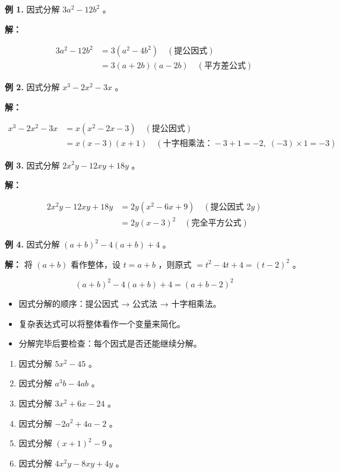\begin{workedexamples}


\textbf{例 1.} 因式分解 $3a^2 - 12b^2$ 。

\textbf{解：}

\[
\begin{aligned}
3a^2 - 12b^2 &= 3(a^2 - 4b^2) \quad (\text{提公因式}) \\
&= 3(a + 2b)(a - 2b) \quad (\text{平方差公式})
\end{aligned}
\]


\textbf{例 2.} 因式分解 $x^3 - 2x^2 - 3x$ 。

\textbf{解：}

\[
\begin{aligned}
x^3 - 2x^2 - 3x &= x(x^2 - 2x - 3) \quad (\text{提公因式}) \\
&= x(x - 3)(x + 1) \quad (\text{十字相乘法：} -3 + 1 = -2,\; (-3) \times 1 = -3)
\end{aligned}
\]


\textbf{例 3.} 因式分解 $2x^2y - 12xy + 18y$ 。

\textbf{解：}

\[
\begin{aligned}
2x^2y - 12xy + 18y &= 2y(x^2 - 6x + 9) \quad (\text{提公因式 } 2y) \\
&= 2y(x - 3)^2 \quad (\text{完全平方公式})
\end{aligned}
\]


\textbf{例 4.} 因式分解 $(a + b)^2 - 4(a + b) + 4$ 。

\textbf{解：} 将 $(a + b)$ 看作整体，设 $t = a + b$ ，则原式 $= t^2 - 4t + 4 = (t - 2)^2$ 。

\[
(a + b)^2 - 4(a + b) + 4 = (a + b - 2)^2
\]


\end{workedexamples}

\begin{keytakeaway}


\begin{itemize}
  \item 因式分解的顺序：提公因式 → 公式法 → 十字相乘法。
  \item 复杂表达式可以将整体看作一个变量来简化。
  \item 分解完毕后要检查：每个因式是否还能继续分解。
\end{itemize}


\end{keytakeaway}

\begin{practice}


\begin{enumerate}
  \item 因式分解 $5x^2 - 45$ 。
  \item 因式分解 $a^3b - 4ab$ 。
  \item 因式分解 $3x^2 + 6x - 24$ 。
  \item 因式分解 $-2a^2 + 4a - 2$ 。
  \item 因式分解 $(x + 1)^2 - 9$ 。
  \item 因式分解 $4x^2y - 8xy + 4y$ 。
\end{enumerate}


\end{practice}



